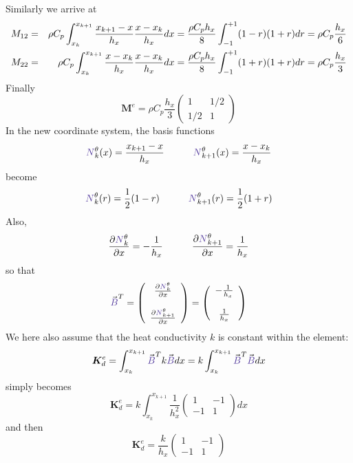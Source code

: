 Similarly we arrive at 
\begin{eqnarray}
M_{12}
&=&\rho C_p 
\int_{x_k}^{x_{k+1}} 
\frac{x_{k+1}-x}{h_x}  
\frac{x-x_k}{h_x}  
dx
=
\frac{\rho C_p  h_x}{8} 
\int_{-1}^{+1} (1-r) (1+r)dr
= \rho C_p\frac{h_x}{6}  \nonumber\\
M_{22}
&=&
\rho C_p 
\int_{x_k}^{x_{k+1}} 
\frac{x-x_k}{h_x}  
\frac{x-x_k}{h_x}  
dx
=
\frac{\rho C_p  h_x}{8} 
\int_{-1}^{+1} (1+r) (1+r)dr
= \rho C_p \frac{h_x}{3} \nonumber 
\end{eqnarray}
Finally 
\[
\boxed{
{\bm M}^e= \rho C_p \frac{h_x}{3}   
\left(
\begin{array}{cc}
1  & 1/2 \\
1/2 & 1
\end{array}
\right)
}
\]
In the new coordinate system, the {\color{olive}basis functions} 
\[
{\color{Violet}N}_k^\theta(x) = \frac{x_{k+1}-x}{h_x} 
\quad
\quad
\quad
{\color{Violet}N}_{k+1}^\theta(x) = \frac{x-x_k}{h_x} 
\]
become 
\[
{\color{Violet}N}_k^\theta(r) = \frac{1}{2} (1-r)
\quad
\quad
\quad
{\color{Violet}N}_{k+1}^\theta(r) = \frac{1}{2} (1+r)
\]
Also, 
\[
\frac{\partial {\color{Violet}N}_k^\theta}{\partial x} = - \frac{1}{h_x} 
\quad
\quad
\quad
\frac{\partial {\color{Violet}N}_{k+1}^\theta}{\partial x} = \frac{1}{h_x} 
\]
so that 
\[
{\vec {\color{Violet}B}}^T=
\left(
\begin{array}{cc}
 \frac{\partial {\color{Violet}N}_k^\theta}{\partial x}   \\ \\
 \frac{\partial {\color{Violet}N}_{k+1}^\theta}{\partial x}
\end{array}
\right)
=
\left(
\begin{array}{cc}
-\frac{1}{h_x} \\ \\
\frac{1}{h_x} 
\end{array}
\right)
\]
We here also assume that the heat conductivity $k$ is constant within the element:
\[
{\bm K}_d^e =
\int_{x_k}^{x_{k+1}}   {\vec {\color{Violet}B}}^T k {\vec {\color{Violet}B}} dx 
= k \int_{x_k}^{x_{k+1}}   {\vec {\color{Violet}B}}^T {\vec {\color{Violet}B}} dx 
\]
simply becomes
\[
{\bm K}_d^e = k
 \int_{x_k}^{x_{k+1}} 
\frac{1}{h_x^2}
\left(
\begin{array}{cc}
1 & -1 \\ -1 & 1
\end{array}
\right)
dx
\]
and then
\[
\boxed{
{\bm K}_d^e =
\frac{k}{h_x}
\left(
\begin{array}{cc}
1 & -1 \\ -1 & 1
\end{array}
\right)
}
\]

